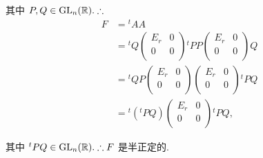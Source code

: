 \documentclass[color=black,device=normal,lang=cn,mode=geye]{elegantnote}
\begin{document}
\begin{solution}
    其中 $P,Q\in\operatorname{GL}_n(\mathbb{R}).\therefore$
    \begin{align*}
        F & ={}^tAA \\
        & ={}^tQ\begin{pmatrix}
            E_r & 0 \\
            0 & 0 \\
        \end{pmatrix}{}^tPP\begin{pmatrix}
            E_r & 0 \\
            0 & 0 \\
        \end{pmatrix}Q \\
        & ={}^tQP\begin{pmatrix}
            E_r & 0 \\
            0 & 0 \\
        \end{pmatrix}\begin{pmatrix}
            E_r & 0 \\
            0 & 0 \\
        \end{pmatrix}{}^tPQ \\
        & ={}^t({}^tPQ)\begin{pmatrix}
            E_r & 0 \\
            0 & 0 \\
        \end{pmatrix}{}^tPQ,
    \end{align*}

    其中 ${}^tPQ\in\operatorname{GL}_n(\mathbb{R}).\therefore F$ 是半正定的.
\end{solution}

    
\end{document}
